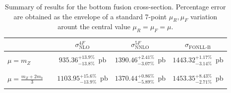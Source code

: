\documentclass[12pt]{article}
\begin{document}
\begin{table}
  \begin{center}
    \begin{tabular}{lcccc}
      \label{tab:xs-res}
      & & $\scriptstyle \sigma^{4F}_{\text{NLO}}$ & $\scriptstyle \sigma^{5F}_{\text{NNLO}}$ & $\scriptstyle\sigma_{\text{FONLL-B}}$\\
      \hline
      &  &  &    &        \\
      $\scriptstyle\mu = m_Z$ & & $\scriptstyle 935.36^{+13.9\%}_{-13.8\%}$~{\small pb} &
      $\scriptstyle 1390.46^{+2.41\%}_{-3.07\%}$~{\small pb} &
      $\scriptstyle 1443.32^{+1.17\%}_{-3.14\%}$~{\small pb} \\
      &  &  &    &        \\
      \hline
      &  &  &    &        \\
      $\scriptstyle \mu = \frac{m_Z+2m_b}{3}$ & &
      $\scriptstyle 1103.95^{+15.6\%}_{-13.9\%}$~{\small pb}  &
      $\scriptstyle 1370.44^{+0.86\%}_{-5.89\%}$~{\small pb} &
      $\scriptstyle 1453.35^{+8.43\%}_{-2.71\%}$~{\small pb}\\
      &  &  &    &        \\
      \hline 
    \end{tabular}
    \caption{\label{tab:res} Summary of results for the bottom fusion
      cross-section.  Percentage error are
      obtained  as the envelope of a standard 7-point $\mu_R,\mu_F$
      variation arount the  central
      value $\mu_R=\mu_F=\mu$.}
  \end{center}
\end{table}



\end{document}
